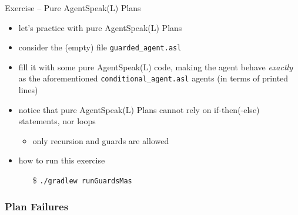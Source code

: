 \documentclass[presentation]{beamer}\mode<presentation>{\usetheme{AMSBolognaFC}}
\begin{document}
\startExercise
\begin{frame}[c, allowframebreaks]{Exercise \currentExercise{} -- Pure AgentSpeak(L) Plans}
    \begin{itemize}
        \item let's practice with pure AgentSpeak(L) Plans
        
        \vspace{.3cm}
        
        
        \item consider the (empty) file \texttt{guarded\_agent.asl}
        
        \vspace{.3cm}
        
        \item fill it with some \alert{pure} AgentSpeak(L) code, making the agent behave \emph{exactly} as the aforementioned \texttt{conditional\_agent.asl} agents (in terms of printed lines)
        
        \vspace{.3cm}
        
        \item notice that pure AgentSpeak(L) Plans cannot rely on if-then(-else) statements, nor loops
        \begin{itemize}
            \item only recursion and guards are allowed
        \end{itemize}
        
        \vspace{.3cm}
        
        \item how to run this exercise
        \begin{itemize}
            \item[\$] \texttt{./gradlew run\alert{Guards}Mas}
        \end{itemize}
        
    \end{itemize}
\end{frame}

\subsubsection{Plan Failures}
\end{document}
